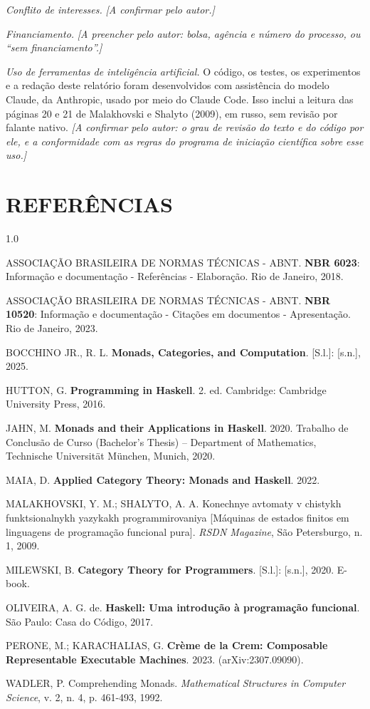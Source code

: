 \documentclass[12pt,a4paper]{article}
\begin{document}
\textit{Conflito de interesses.} \textit{[A confirmar pelo autor.]}

\textit{Financiamento.} \textit{[A preencher pelo autor: bolsa, agência e número do processo, ou ``sem financiamento''.]}

\textit{Uso de ferramentas de inteligência artificial.} O código, os testes, os experimentos e a redação deste relatório foram desenvolvidos com assistência do modelo Claude, da Anthropic, usado por meio do Claude Code. Isso inclui a leitura das páginas 20 e 21 de Malakhovski e Shalyto (2009), em russo, sem revisão por falante nativo. \textit{[A confirmar pelo autor: o grau de revisão do texto e do código por ele, e a conformidade com as regras do programa de iniciação científica sobre esse uso.]}

\newpage
\section{REFERÊNCIAS}

\begingroup
\setlength{\parindent}{0pt}
\setlength{\parskip}{0.6em}
\begin{spacing}{1.0}

ASSOCIAÇÃO BRASILEIRA DE NORMAS TÉCNICAS - ABNT. \textbf{NBR 6023}: Informação e documentação - Referências - Elaboração. Rio de Janeiro, 2018.

ASSOCIAÇÃO BRASILEIRA DE NORMAS TÉCNICAS - ABNT. \textbf{NBR 10520}: Informação e documentação - Citações em documentos - Apresentação. Rio de Janeiro, 2023.

BOCCHINO JR., R. L. \textbf{Monads, Categories, and Computation}. [S.l.]: [s.n.], 2025.

HUTTON, G. \textbf{Programming in Haskell}. 2. ed. Cambridge: Cambridge University Press, 2016.

JAHN, M. \textbf{Monads and their Applications in Haskell}. 2020. Trabalho de Conclusão de Curso (Bachelor's Thesis) -- Department of Mathematics, Technische Universität München, Munich, 2020.

MAIA, D. \textbf{Applied Category Theory: Monads and Haskell}. 2022.

MALAKHOVSKI, Y. M.; SHALYTO, A. A. Konechnye avtomaty v chistykh funktsionalnykh yazykakh programmirovaniya [Máquinas de estados finitos em linguagens de programação funcional pura]. \textit{RSDN Magazine}, São Petersburgo, n. 1, 2009.

MILEWSKI, B. \textbf{Category Theory for Programmers}. [S.l.]: [s.n.], 2020. E-book.

OLIVEIRA, A. G. de. \textbf{Haskell: Uma introdução à programação funcional}. São Paulo: Casa do Código, 2017.

PERONE, M.; KARACHALIAS, G. \textbf{Crème de la Crem: Composable Representable Executable Machines}. 2023. (arXiv:2307.09090).

WADLER, P. Comprehending Monads. \textit{Mathematical Structures in Computer Science}, v. 2, n. 4, p. 461-493, 1992.

\end{spacing}
\endgroup
\end{document}
